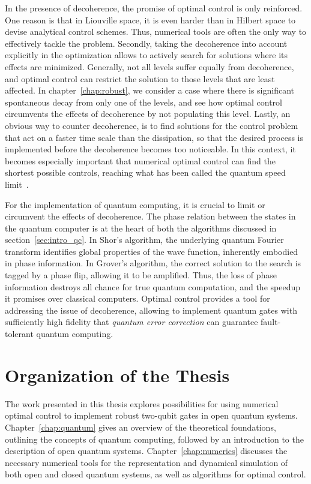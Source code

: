 In the presence of decoherence, the promise of optimal control is
only reinforced. One reason is that in Liouville space, it is even harder than
in Hilbert space to devise analytical control schemes. Thus, numerical tools are
often the only way to effectively tackle the problem. Secondly, taking the
decoherence into account explicitly in the optimization allows to actively
search for solutions where its effects are minimized. Generally, not all levels
suffer equally from decoherence, and optimal control can restrict the solution to
those levels that are least affected. In chapter~\ref{chap:robust}, we consider
a case where there is significant spontaneous decay from only one of the levels,
and see how optimal control circumvents the effects of decoherence by not
populating this level. Lastly, an obvious way to counter decoherence, is to find
solutions for the control problem that act on a faster time scale than the
dissipation, so that the desired process is implemented before the decoherence
becomes too noticeable. In this context, it becomes especially important that
numerical optimal control can find the shortest possible controls, reaching what
has been called the quantum speed
limit~\cite{CampoPRL2013,LevitinPRL2009,MargolusPD1998,BhattacharyyaJPA1983,GoerzJPB11}.


For the implementation of quantum computing, it is crucial to limit or
circumvent the effects of decoherence.
The phase relation between the states in the quantum computer is at the heart of
both the algorithms discussed in section~\ref{sec:intro_qc}. In Shor's
algorithm, the underlying quantum Fourier transform identifies global
properties of the wave function, inherently embodied in phase information. In
Grover's algorithm, the correct solution to the search is tagged by a phase flip,
allowing it to be amplified. Thus, the loss of phase information destroys all
chance for true quantum computation, and the speedup it promises over classical
computers. Optimal control provides a tool for addressing the issue of
decoherence, allowing to implement quantum gates with sufficiently high fidelity
that \emph{quantum error correction} can guarantee fault-tolerant quantum
computing.


\section{Organization of the Thesis}

The work presented in this thesis explores possibilities for using numerical
optimal control to implement robust two-qubit gates in open quantum systems.
Chapter~\ref{chap:quantum} gives an overview of the theoretical foundations,
outlining the concepts of quantum computing, followed by an introduction to the
description of open quantum systems.
Chapter~\ref{chap:numerics} discusses the necessary numerical tools for the
representation and dynamical simulation of both open and closed quantum systems,
as well as algorithms for optimal control.

